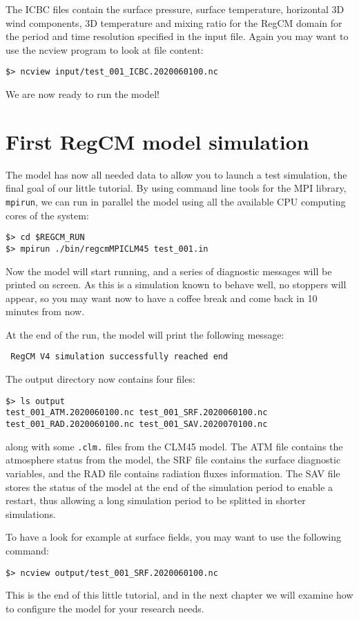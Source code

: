 The ICBC files contain the surface pressure, surface temperature, horizontal
3D wind components, 3D temperature and mixing ratio for the RegCM domain for the
period and time resolution specified in the input file.
Again you may want to use the ncview program to look at file content:

\begin{Verbatim}
$> ncview input/test_001_ICBC.2020060100.nc
\end{Verbatim}

We are now ready to run the model!

\section{First RegCM model simulation}

The model has now all needed data to allow you to launch a test simulation,
the final goal of our little tutorial. By using command line tools for the
MPI library, \verb=mpirun=, we can run in parallel the model using all the
available CPU computing cores of the system:

\begin{Verbatim}
$> cd $REGCM_RUN
$> mpirun ./bin/regcmMPICLM45 test_001.in
\end{Verbatim}

Now the model will start running, and a series of diagnostic messages will be
printed on screen. As this is a simulation known to behave well, no stoppers
will appear, so you may want now to have a coffee break and come back in 10
minutes from now.

At the end of the run, the model will print the following message:

\begin{Verbatim}
 RegCM V4 simulation successfully reached end
\end{Verbatim}

The output directory now contains four files:

\begin{Verbatim}
$> ls output
test_001_ATM.2020060100.nc test_001_SRF.2020060100.nc
test_001_RAD.2020060100.nc test_001_SAV.2020070100.nc
\end{Verbatim}

along with some \verb=.clm.= files from the CLM45 model.
The ATM file contains the atmosphere status from the model, the SRF file
contains the surface diagnostic variables, and the RAD file contains radiation
fluxes information. The SAV file stores the status of the model at the end of
the simulation period to enable a restart, thus allowing a long simulation
period to be splitted in shorter simulations.

To have a look for example at surface fields, you may want to use the
following command:

\begin{Verbatim}
$> ncview output/test_001_SRF.2020060100.nc
\end{Verbatim}

This is the end of this little tutorial, and in the next chapter we will
examine how to configure the model for your research needs.
